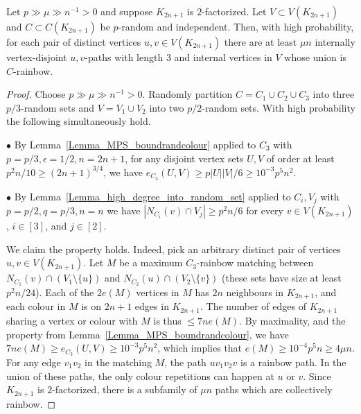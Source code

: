 \begin{lemma}\label{Lemma_short_paths_between_two_vertices}  Let $p\gg \mu \gg n^{-1}>0$ and suppose $K_{2n+1}$ is $2$-factorized. Let $V\subset V(K_{2n+1})$ and $C\subset C(K_{2n+1})$ be $p$-random and independent. Then, with high probability, for each pair of distinct vertices $u,v\in V(K_{2n+1})$ there are at least
$\mu n$ internally vertex-disjoint  $u,v$-paths with length $3$ and internal vertices in $V$ whose union is $C$-rainbow.
\end{lemma}
\begin{proof}
Choose $p\gg  \mu \gg n^{-1}>0$.
Randomly partition $C=C_1\cup C_2\cup C_{3}$ into three $p/3$-random sets and $V=V_1\cup V_2$ into two $p/2$-random sets. With high probability the following simultaneously hold.

$\bullet$ By Lemma~\ref{Lemma_MPS_boundrandcolour} applied to $C_3$ with $p=p/3, \epsilon=1/2, n=2n+1$,  for any disjoint vertex sets $U,V$ of order at least $p^2n/10\geq (2n+1)^{3/4}$, we have $e_{C_3}(U,V)\geq p|U||V|/6\geq 10^{-3}p^5n^2$.

$\bullet$ By Lemma~\ref{Lemma_high_degree_into_random_set} applied to $C_i, V_j$ with $p=p/2, q=p/3, n=n$ we have $|N_{C_{i}}(v)\cap V_j| \geq p^2n/6$ for every $v\in V(K_{2n+1})$, $i\in [3]$, and $j\in [2]$.

We claim the property holds. Indeed, pick an arbitrary distinct pair of vertices $u,v\in V(K_{2n+1})$. Let $M$ be a maximum $C_3$-rainbow matching between $N_{C_{1}}(v)\cap (V_1\setminus \{u\})$ and $N_{C_{2}}(u)\cap (V_2\setminus \{v\})$ (these sets have size at least $p^2n/24$). Each of the $2e(M)$ vertices in $M$ has $2n$ neighbours in $K_{2n+1}$, and each colour in $M$ is on $2n+1$ edges in $K_{2n+1}$. The number of edges of $K_{2n+1}$ sharing a vertex or colour with $M$ is thus $\leq 7ne(M)$. By maximality, and the property from Lemma~\ref{Lemma_MPS_boundrandcolour}, we have $7ne(M)\geq e_{C_3}(U,V) \geq 10^{-3}p^5n^2$, which implies that $e(M)\geq 10^{-4}p^5n \geq  4\mu n$.
For any edge $v_1v_2$ in the matching $M$, the path $uv_1v_2v$ is a rainbow path. In the union of these paths, the only colour repetitions can happen at $u$ or $v$. Since  $K_{2n+1}$ is $2$-factorized, there is a subfamily of $\mu n$ paths which are collectively rainbow.
\end{proof}

